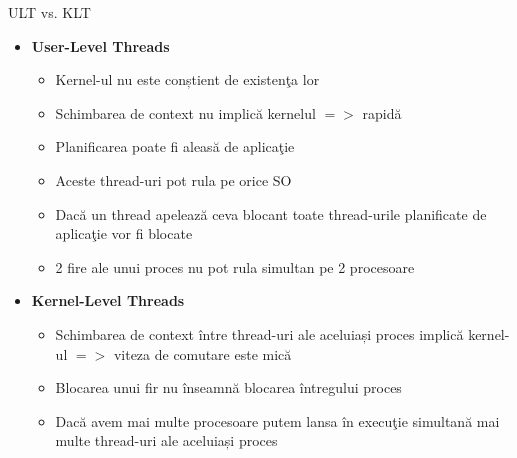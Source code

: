 \documentclass{so.cs.pub.ro}
\begin{document}
\begin{frame}{ULT vs. KLT}
\begin{itemize}
	\item {\bf User-Level Threads}
	\begin{itemize}
		\item Kernel-ul nu este conștient de existenţa lor
		\item Schimbarea de context nu implică kernelul $=>$ rapidă
		\item Planificarea poate fi aleasă de aplicaţie
		\item Aceste thread-uri pot rula pe orice SO
		\item Dacă un thread apelează ceva blocant toate thread-urile planificate de aplicaţie vor fi blocate
		\item 2 fire ale unui proces nu pot rula simultan pe 2 procesoare
	\end{itemize}
	\vspace{0.1cm}
	\item {\bf Kernel-Level Threads}
	\begin{itemize}
		\item Schimbarea de context între thread-uri ale aceluiași proces implică kernel-ul
		$=>$ viteza de comutare este mică
		\item Blocarea unui fir nu înseamnă blocarea întregului proces
		\item Dacă avem mai multe procesoare putem lansa în execuţie simultană mai multe thread-uri ale aceluiași proces
	\end{itemize}
\end{itemize}
\end{frame}
\end{document}
